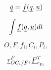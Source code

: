 





\[
\vecd{\dot{q}} = \vecd{f} (\vecd{q}, \vecd{u})
\]

\[
  \int  \vecd{f} (\vecd{q}, \vecd{u}) dt
\]


\[
  O, F, f_{i}, C_{i}, P_{i},
 \]

\[
  \pvec{r}{OC_{i}}{F}{F}, \vecd{F}^{T}_{e_{p_i}}
\]








